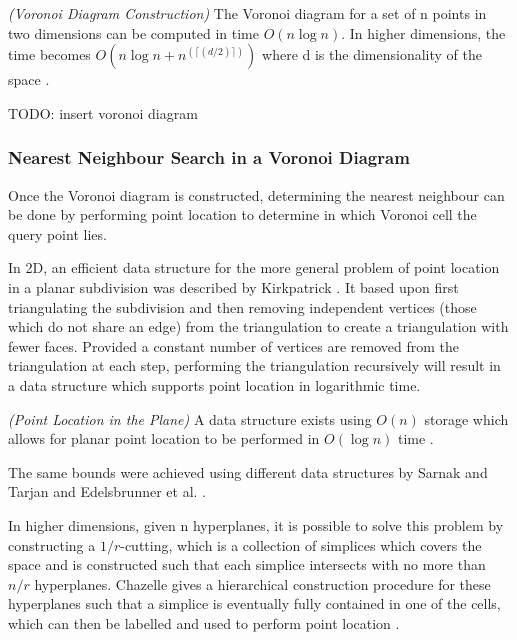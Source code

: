 \documentclass[mcs]{scsthesis}
\begin{document}
\begin{thm} \emph{(Voronoi Diagram Construction)}
The Voronoi diagram for a set of n points in two dimensions can be computed
in time \(O(n \log n)\). In higher dimensions, the time becomes
\(O(n \log n + n^(\lceil(d/2)\rceil))\) where d is the dimensionality of the
space \cite{dutch}.
\end{thm}

TODO: insert voronoi diagram

\subsubsection{Nearest Neighbour Search in a Voronoi Diagram}

Once the Voronoi diagram is constructed, determining the nearest neighbour can
be done by performing point location to determine in which Voronoi cell the
query point lies.

In 2D, an efficient data structure for the more general problem of point
location in a planar subdivision was described by Kirkpatrick
\cite{kirkpatrick}. It based upon first triangulating the subdivision and then
removing independent vertices (those which do not share an edge) from the
triangulation to create a triangulation with fewer faces. Provided a constant
number of vertices are removed from the triangulation at each step, performing
the triangulation recursively will result in a data structure which supports
point location in logarithmic time.

\begin{thm} \emph{(Point Location in the Plane)}
A data structure exists using \(O(n)\) storage which allows for planar
point location to be performed in \(O(\log n)\) time \cite{kirkpatrick}.
\end{thm}

The same bounds were achieved using different data structures by Sarnak and
Tarjan \cite{sarnak} and Edelsbrunner et al. \cite{edelsbrunner}.

In higher dimensions, given n hyperplanes, it is possible to solve this problem
by constructing a \(1/r\)-cutting, which is a collection of simplices which
covers the space and is constructed such that each simplice intersects with no
more than \(n/r\) hyperplanes. Chazelle gives a hierarchical construction
procedure for these hyperplanes such that a simplice is eventually fully
contained in one of the cells, which can then be labelled and used to perform
point location \cite{chazelle}.
\end{document}
